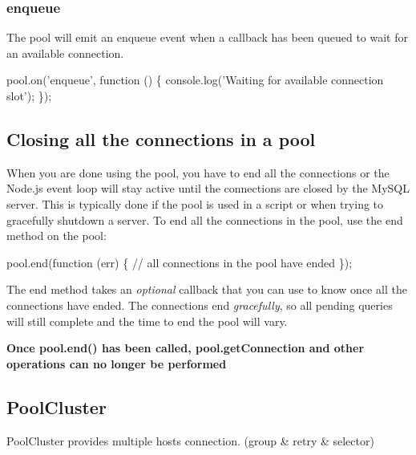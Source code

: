 \subsubsection*{enqueue}

The pool will emit an {\ttfamily enqueue} event when a callback has been queued to wait for an available connection.


\begin{DoxyCode}
pool.on(\textcolor{stringliteral}{'enqueue'}, \textcolor{keyword}{function} () \{
  console.log(\textcolor{stringliteral}{'Waiting for available connection slot'});
\});
\end{DoxyCode}


\subsection*{Closing all the connections in a pool}

When you are done using the pool, you have to end all the connections or the Node.\+js event loop will stay active until the connections are closed by the My\+S\+Q\+L server. This is typically done if the pool is used in a script or when trying to gracefully shutdown a server. To end all the connections in the pool, use the {\ttfamily end} method on the pool\+:


\begin{DoxyCode}
pool.end(\textcolor{keyword}{function} (err) \{
  \textcolor{comment}{// all connections in the pool have ended}
\});
\end{DoxyCode}


The {\ttfamily end} method takes an {\itshape optional} callback that you can use to know once all the connections have ended. The connections end {\itshape gracefully}, so all pending queries will still complete and the time to end the pool will vary.

{\bfseries Once {\ttfamily pool.\+end()} has been called, {\ttfamily pool.\+get\+Connection} and other operations can no longer be performed}

\subsection*{Pool\+Cluster}

Pool\+Cluster provides multiple hosts connection. (group \& retry \& selector)


